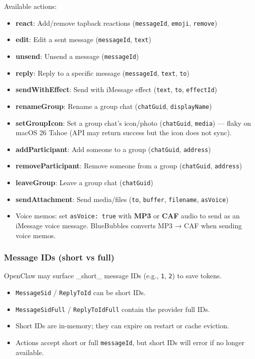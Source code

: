 Available actions:

\begin{itemize}
  \item \textbf{react}: Add/remove tapback reactions (\texttt{messageId}, \texttt{emoji}, \texttt{remove})
  \item \textbf{edit}: Edit a sent message (\texttt{messageId}, \texttt{text})
  \item \textbf{unsend}: Unsend a message (\texttt{messageId})
  \item \textbf{reply}: Reply to a specific message (\texttt{messageId}, \texttt{text}, \texttt{to})
  \item \textbf{sendWithEffect}: Send with iMessage effect (\texttt{text}, \texttt{to}, \texttt{effectId})
  \item \textbf{renameGroup}: Rename a group chat (\texttt{chatGuid}, \texttt{displayName})
  \item \textbf{setGroupIcon}: Set a group chat's icon/photo (\texttt{chatGuid}, \texttt{media}) — flaky on macOS 26 Tahoe (API may return success but the icon does not sync).
  \item \textbf{addParticipant}: Add someone to a group (\texttt{chatGuid}, \texttt{address})
  \item \textbf{removeParticipant}: Remove someone from a group (\texttt{chatGuid}, \texttt{address})
  \item \textbf{leaveGroup}: Leave a group chat (\texttt{chatGuid})
  \item \textbf{sendAttachment}: Send media/files (\texttt{to}, \texttt{buffer}, \texttt{filename}, \texttt{asVoice})
  \item Voice memos: set \texttt{asVoice: true} with \textbf{MP3} or \textbf{CAF} audio to send as an iMessage voice message. BlueBubbles converts MP3 → CAF when sending voice memos.
\end{itemize}


\subsubsection{Message IDs (short vs full)}


OpenClaw may surface \_short\_ message IDs (e.g., \texttt{1}, \texttt{2}) to save tokens.

\begin{itemize}
  \item \texttt{MessageSid} / \texttt{ReplyToId} can be short IDs.
  \item \texttt{MessageSidFull} / \texttt{ReplyToIdFull} contain the provider full IDs.
  \item Short IDs are in-memory; they can expire on restart or cache eviction.
  \item Actions accept short or full \texttt{messageId}, but short IDs will error if no longer available.
\end{itemize}


